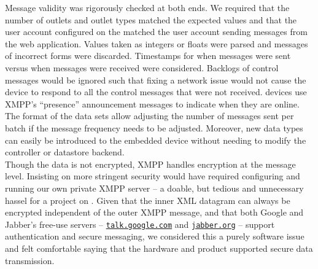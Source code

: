 Message validity was rigorously checked at both ends.  We required that the number of outlets and outlet types matched the expected values and that the user account configured on the \netlet matched the user account sending messages from the web application.  Values taken as integers or floats were parsed and messages of incorrect forms were discarded.  Timestamps for when messages were sent versus when messages were received were considered.  Backlogs of control messages would be ignored such that fixing a network issue would not cause the device to respond to all the control messages that were not received.  \netlet devices use XMPP's ``presence'' announcement messages to indicate when they are online.  The format of the data sets allow adjusting the number of messages sent per batch if the message frequency needs to be adjusted.  Moreover, new data types can easily be introduced to the embedded device without needing to modify the controller or datastore backend.\\

Though the data is not encrypted, XMPP handles encryption at the message level.  Insisting on more stringent security would have required configuring and running our own private XMPP server -- a doable, but tedious and unnecessary hassel for a project on \coursetitle. Given that the inner XML datagram can always be encrypted independent of the outer XMPP message, and that both Google and Jabber's free-use servers -- \texttt{\url{talk.google.com}} and \texttt{\url{jabber.org}} -- support authentication and secure messaging, we considered this a purely software issue and felt comfortable saying that the hardware and product supported secure data transmission.\\



